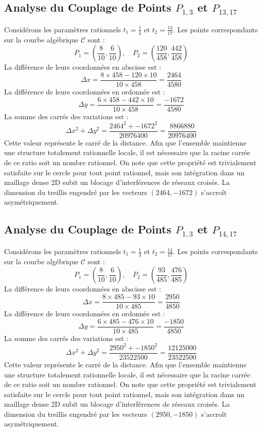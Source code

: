 \documentclass[12pt, a4paper]{article}
\begin{document}
\subsection{Analyse du Couplage de Points $P_{1,3}$ et $P_{13,17}$}
Considérons les paramètres rationnels $t_1 = \frac{1}{3}$ et $t_2 = \frac{13}{17}$.
Les points correspondants sur la courbe algébrique $\mathcal{C}$ sont :
$$ P_1 = \left( \frac{8}{10}, \frac{6}{10} \right), \quad P_2 = \left( \frac{120}{458}, \frac{442}{458} \right) $$
La différence de leurs coordonnées en abscisse est :
$$ \Delta x = \frac{8 \times 458 - 120 \times 10}{10 \times 458} = \frac{2464}{4580} $$
La différence de leurs coordonnées en ordonnée est :
$$ \Delta y = \frac{6 \times 458 - 442 \times 10}{10 \times 458} = \frac{-1672}{4580} $$
La somme des carrés des variations est :
$$ \Delta x^2 + \Delta y^2 = \frac{ 2464^2 + -1672^2 }{ 20976400 } = \frac{ 8866880 }{ 20976400 } $$
Cette valeur représente le carré de la distance. Afin que l'ensemble maintienne une structure totalement rationnelle locale, il est nécessaire que la racine carrée de ce ratio soit un nombre rationnel. On note que cette propriété est trivialement satisfaite sur le cercle pour tout point rationnel, mais son intégration dans un maillage dense 2D subit un blocage d'interférences de réseaux croisés. La dimension du treillis engendré par les vecteurs $( 2464, -1672 )$ s'accroît asymétriquement.


\subsection{Analyse du Couplage de Points $P_{1,3}$ et $P_{14,17}$}
Considérons les paramètres rationnels $t_1 = \frac{1}{3}$ et $t_2 = \frac{14}{17}$.
Les points correspondants sur la courbe algébrique $\mathcal{C}$ sont :
$$ P_1 = \left( \frac{8}{10}, \frac{6}{10} \right), \quad P_2 = \left( \frac{93}{485}, \frac{476}{485} \right) $$
La différence de leurs coordonnées en abscisse est :
$$ \Delta x = \frac{8 \times 485 - 93 \times 10}{10 \times 485} = \frac{2950}{4850} $$
La différence de leurs coordonnées en ordonnée est :
$$ \Delta y = \frac{6 \times 485 - 476 \times 10}{10 \times 485} = \frac{-1850}{4850} $$
La somme des carrés des variations est :
$$ \Delta x^2 + \Delta y^2 = \frac{ 2950^2 + -1850^2 }{ 23522500 } = \frac{ 12125000 }{ 23522500 } $$
Cette valeur représente le carré de la distance. Afin que l'ensemble maintienne une structure totalement rationnelle locale, il est nécessaire que la racine carrée de ce ratio soit un nombre rationnel. On note que cette propriété est trivialement satisfaite sur le cercle pour tout point rationnel, mais son intégration dans un maillage dense 2D subit un blocage d'interférences de réseaux croisés. La dimension du treillis engendré par les vecteurs $( 2950, -1850 )$ s'accroît asymétriquement.
\end{document}
